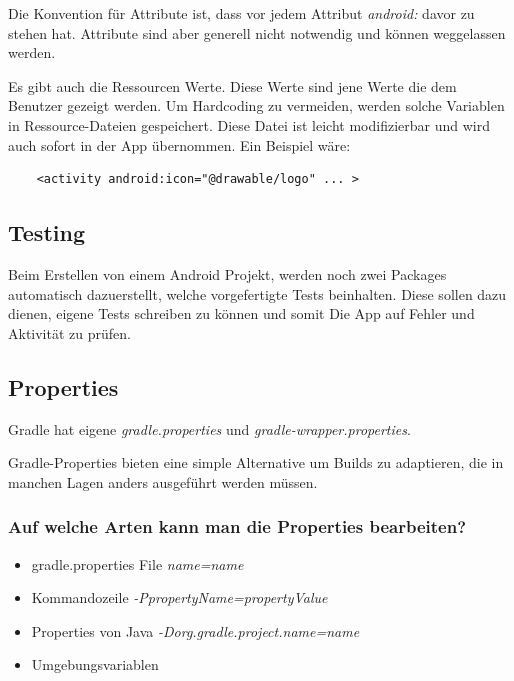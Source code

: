 Die Konvention für Attribute ist, dass vor jedem Attribut \textit{android:} davor zu stehen hat. Attribute sind aber 
generell nicht notwendig und können weggelassen werden.

Es gibt auch die Ressourcen Werte. Diese Werte sind jene Werte die dem Benutzer gezeigt werden. Um Hardcoding zu vermeiden,
werden solche Variablen in Ressource-Dateien gespeichert. Diese Datei ist leicht modifizierbar und wird auch 
sofort in der App übernommen. Ein Beispiel wäre:

\begin{lstlisting}
    <activity android:icon="@drawable/logo" ... >
\end{lstlisting}

\subsection{Testing}
Beim Erstellen von einem Android Projekt, werden noch zwei Packages automatisch dazuerstellt, welche vorgefertigte Tests beinhalten. 
Diese sollen dazu dienen, eigene Tests schreiben zu können und somit Die App auf Fehler und Aktivität zu prüfen.

\subsection{Properties}
Gradle hat eigene \textit{gradle.properties} und \textit{gradle-wrapper.properties}.

\cite{Gradle-properties}
Gradle-Properties bieten eine simple Alternative um Builds zu adaptieren,
 die in manchen Lagen anders ausgeführt werden müssen.

\subsubsection{Auf welche Arten kann man die Properties bearbeiten?}

\begin{itemize}
    \item gradle.properties File
    \subitem \textit{name=name }
    \item Kommandozeile
    \subitem \textit{-PpropertyName=propertyValue }
    \item Properties von Java 
    \subitem \textit{-Dorg.gradle.project.name=name}
    \item Umgebungsvariablen
    
\end{itemize}


